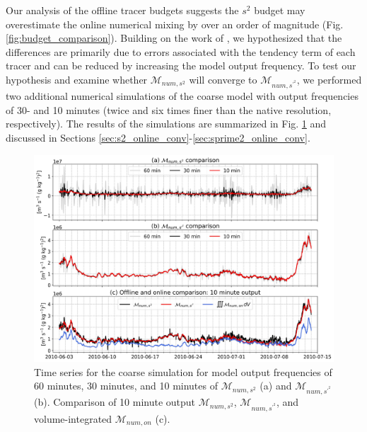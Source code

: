 Our analysis of the offline tracer budgets suggests the $s^2$ budget may overestimate the online numerical mixing by over an order of magnitude (Fig. \ref{fig:budget_comparison}). Building on the work of \citet{Wang_2021}, we hypothesized that the differences are primarily due to errors associated with the tendency term of each tracer and can be reduced by increasing the model output frequency. To test our hypothesis and examine whether $\mathcal{M}_{num, s^2}$ will converge to $\mathcal{M}_{num, s^{\prime^2}}$, we performed two additional numerical simulations of the coarse model with output frequencies of 30- and 10 minutes (twice and six times finer than the native resolution, respectively). The results of the simulations are summarized in Fig. \ref{fig:mixing_time_series} and discussed in Sections \ref{sec:s2_online_conv}-\ref{sec:sprime2_online_conv}.

\begin{figure}[h]
 \centerline{\includegraphics[width = \linewidth]{figures/james_2023/Figure10_output_freq.jpg}}
  \caption{Time series for the coarse simulation for model output frequencies of 60 minutes, 30 minutes, and 10 minutes of $\mathcal{M}_{num, s^2}$ (a) and $\mathcal{M}_{num, s^{\prime^2}}$ (b). Comparison of 10 minute output $\mathcal{M}_{num, s^2}$, $\mathcal{M}_{num, s^{\prime^2}}$, and volume-integrated $\mathcal{M}_{num, on}$  (c).}
  \label{fig:mixing_time_series}
\end{figure}

